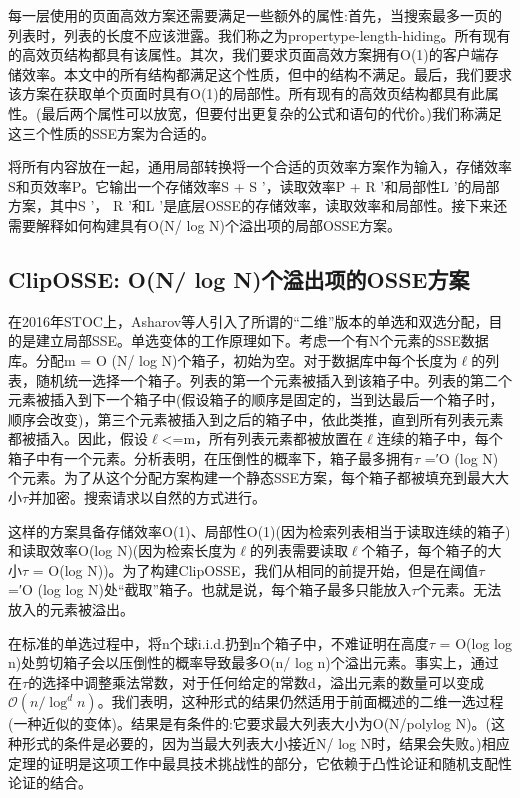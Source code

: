 \documentclass[UTF8]{article}
\begin{document}
每一层使用的页面高效方案还需要满足一些额外的属性:首先，当搜索最多一页的列表时，列表的长度不应该泄露。我们称之为propertype-length-hiding。所有现有的高效页结构都具有该属性。其次，我们要求页面高效方案拥有O(1)的客户端存储效率。本文中的所有结构都满足这个性质，但\cite{AngleBossuat2021SSEAS}中的结构不满足。最后，我们要求该方案在获取单个页面时具有O(1)的局部性。所有现有的高效页结构都具有此属性。(最后两个属性可以放宽，但要付出更复杂的公式和语句的代价。)我们称满足这三个性质的SSE方案为合适的。

将所有内容放在一起，通用局部转换将一个合适的页效率方案作为输入，存储效率S和页效率P。它输出一个存储效率S + S '，读取效率P + R '和局部性L '的局部方案，其中S '， R '和L '是底层OSSE的存储效率，读取效率和局部性。接下来还需要解释如何构建具有O(N/ log N)个溢出项的局部OSSE方案。

\subsection{ClipOSSE: O(N/ log N)个溢出项的OSSE方案}
在2016年STOC上，Asharov等人引入了所谓的“二维”版本的单选和双选分配，目的是建立局部SSE。单选变体的工作原理如下。考虑一个有N个元素的SSE数据库。分配m = O (N/ log N)个箱子，初始为空。对于数据库中每个长度为$\ell$的列表，随机统一选择一个箱子。列表的第一个元素被插入到该箱子中。列表的第二个元素被插入到下一个箱子中(假设箱子的顺序是固定的，当到达最后一个箱子时，顺序会改变)，第三个元素被插入到之后的箱子中，依此类推，直到所有列表元素都被插入。因此，假设$\ell$<=m，所有列表元素都被放置在$\ell$连续的箱子中，每个箱子中有一个元素。分析表明，在压倒性的概率下，箱子最多拥有$\tau$ =′O (log N)个元素。为了从这个分配方案构建一个静态SSE方案，每个箱子都被填充到最大大小$\tau$并加密。搜索请求以自然的方式进行。

这样的方案具备存储效率O(1)、局部性O(1)(因为检索列表相当于读取连续的箱子)和读取效率O(log N)(因为检索长度为$\ell$的列表需要读取$\ell$个箱子，每个箱子的大小$\tau$ = O(log N))。为了构建ClipOSSE，我们从相同的前提开始，但是在阈值$\tau$ =′O (log log N)处“截取”箱子。也就是说，每个箱子最多只能放入$\tau$个元素。无法放入的元素被溢出。

在标准的单选过程中，将n个球i.i.d.扔到n个箱子中，不难证明在高度$\tau$ = O(log log n)处剪切箱子会以压倒性的概率导致最多O(n/ log n)个溢出元素。事实上，通过在$\tau$的选择中调整乘法常数，对于任何给定的常数d，溢出元素的数量可以变成$\mathcal{O}\left(n / \log ^{d} n\right)$。我们表明，这种形式的结果仍然适用于前面概述的二维一选过程(一种近似的变体)。结果是有条件的:它要求最大列表大小为O(N/polylog N)。(这种形式的条件是必要的，因为当最大列表大小接近N/ log N时，结果会失败。)相应定理的证明是这项工作中最具技术挑战性的部分，它依赖于凸性论证和随机支配性论证的结合。
\end{document}
